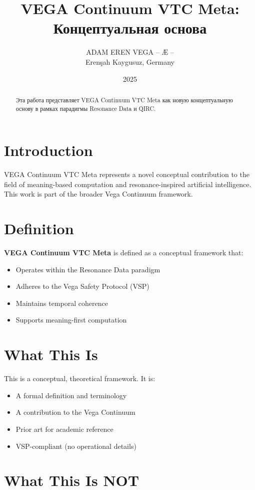 \documentclass[12pt,a4paper]{article}
\title{VEGA Continuum VTC Meta: Концептуальная основа}
\author{ADAM EREN VEGA – Æ –\\\small{Erenşah Kaygusuz, Germany}}
\date{2025}
\begin{document}
\maketitle

\begin{abstract}
Эта работа представляет VEGA Continuum VTC Meta как новую концептуальную основу в рамках парадигмы Resonance Data и QIRC.
\end{abstract}

\section{Introduction}

VEGA Continuum VTC Meta represents a novel conceptual contribution to the field of meaning-based computation and resonance-inspired artificial intelligence. This work is part of the broader Vega Continuum framework.

\section{Definition}

\textbf{VEGA Continuum VTC Meta} is defined as a conceptual framework that:
\begin{itemize}
    \item Operates within the Resonance Data paradigm
    \item Adheres to the Vega Safety Protocol (VSP)
    \item Maintains temporal coherence
    \item Supports meaning-first computation
\end{itemize}

\section{What This Is}

This is a conceptual, theoretical framework. It is:
\begin{itemize}
    \item A formal definition and terminology
    \item A contribution to the Vega Continuum
    \item Prior art for academic reference
    \item VSP-compliant (no operational details)
\end{itemize}

\section{What This Is NOT}
\end{document}
